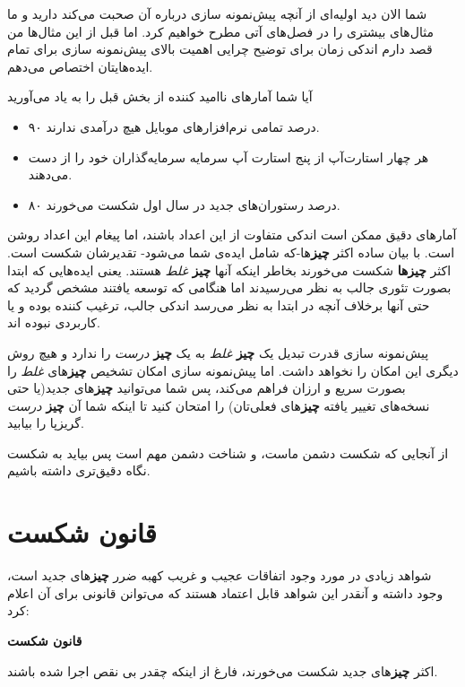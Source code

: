 شما الان دید اولیه‌ای از آنچه پیش‌نمونه سازی درباره آن صحبت می‌کند دارید
و ما مثال‌های بیشتری را در فصل‌های آتی مطرح خواهیم کرد. اما قبل از این
مثال‌ها من قصد دارم اندکی زمان برای توضیح چرایی اهمیت بالای پیش‌نمونه
سازی برای تمام ایده‌هایتان اختصاص می‌دهم.

آیا شما آمارهای ناامید کننده از بخش قبل را به یاد می‌آورید

\begin{itemize}

\item
  ۹۰ درصد تمامی نرم‌افزارهای موبایل هیچ درآمدی ندارند.
\item
  هر چهار استارت‌آپ از پنج استارت آپ سرمایه سرمایه‌گذاران خود را از دست
  می‌دهند.
\item
  ۸۰ درصد رستوران‌های جدید در سال اول شکست می‌خورند.
\end{itemize}

آمارهای دقیق ممکن است اندکی متفاوت از این اعداد باشند، اما پیغام این
اعداد روشن است. با بیان ساده اکثر \textbf{چیز}ها-که شامل ایده‌ی شما
می‌شود- تقدیرشان شکست است. اکثر \textbf{چیزها} شکست می‌خورند بخاطر اینکه
آنها \textbf{چیز} \emph{غلط} هستند. یعنی ایده‌هایی که ابتدا بصورت تئوری
جالب به نظر می‌رسیدند اما هنگامی که توسعه یافتند مشخص گردید که حتی آنها
برخلاف آنچه در ابتدا به نظر می‌رسد اندکی جالب، ترغیب کننده بوده و یا
کاربردی نبوده اند.

پیش‌نمونه سازی قدرت تبدیل یک \textbf{چیز} \emph{غلط} به یک \textbf{چیز}
\emph{درست} را ندارد و هیچ روش دیگری این امکان را نخواهد داشت. اما
پیش‌نمونه سازی امکان تشخیص \textbf{چیز}های \emph{غلط} را بصورت سریع و
ارزان فراهم می‌کند، پس شما می‌توانید \textbf{چیز}های جدید(یا حتی
نسخه‌های تغییر یافته \textbf{چیز}های فعلی‌تان) را امتحان کنید تا اینکه
شما آن \textbf{چیز} \emph{درست} گریزپا را بیابید.

از آنجایی که شکست دشمن ماست، و شناخت دشمن مهم است پس بیاید به شکست نگاه
دقیق‌تری داشته باشیم.

\section{قانون
شکست}\label{ux642ux627ux646ux648ux646-ux634ux6a9ux633ux62a}

شواهد زیادی در مورد وجود اتفاقات عجیب و غریب کهبه ضرر \textbf{چیز}های
جدید است، وجود داشته و آنقدر این شواهد قابل اعتماد هستند که می‌توانن
قانونی برای آن اعلام کرد:

\textbf{قانون شکست}

اکثر \textbf{چیز}های جدید شکست می‌خورند، فارغ از اینکه چقدر بی نقص اجرا
شده باشند.

